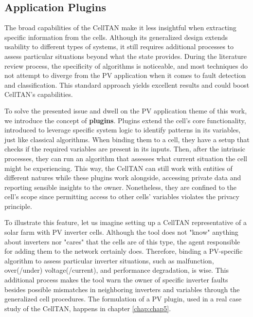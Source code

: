 \subsection{Application Plugins} \label{subsec:plugins}


The broad capabilities of the CellTAN make it less insightful when extracting specific information from the cells. Although its generalized design extends usability to different types of systems, it still requires additional processes to assess particular situations beyond what the state provides. During the literature review process, the specificity of algorithms is noticeable, and most techniques do not attempt to diverge from the PV application when it comes to fault detection and classification. This standard approach yields excellent results and could boost CellTAN's capabilities.

To solve the presented issue and dwell on the PV application theme of this work, we introduce the concept of \textbf{plugins}. Plugins extend the cell's core functionality, introduced to leverage specific system logic to identify patterns in its variables, just like classical algorithms. When binding them to a cell, they have a setup that checks if the required variables are present in its inputs. Then, after the intrinsic processes, they can run an algorithm that assesses what current situation the cell might be experiencing. This way, the CellTAN can still work with entities of different natures while these plugins work alongside, accessing private data and reporting sensible insights to the owner. Nonetheless, they are confined to the cell's scope since permitting access to other cells' variables violates the privacy principle.

To illustrate this feature, let us imagine setting up a CellTAN representative of a solar farm with PV inverter cells. Although the tool does not "know" anything about inverters nor "cares" that the cells are of this type, the agent responsible for adding them to the network certainly does. Therefore, binding a PV-specific algorithm to assess particular inverter situations, such as malfunction, over(/under) voltage(/current), and performance degradation, is wise. This additional process makes the tool warn the owner of specific inverter faults besides possible mismatches in neighboring inverters and variables through the generalized cell procedures. The formulation of a PV plugin, used in a real case study of the CellTAN, happens in chapter \ref{chap:chap5}.

